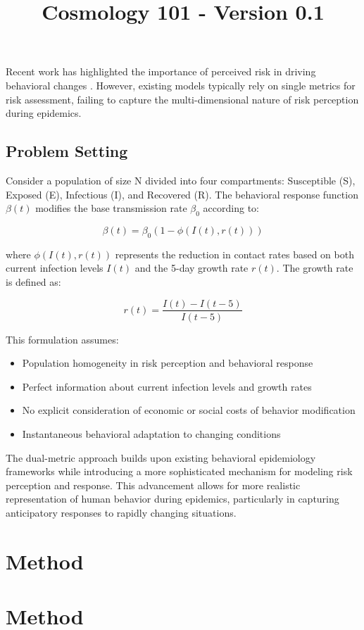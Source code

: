 \documentclass{article}\usepackage{graphicx} \usepackage{amsmath} \usepackage{colortbl}\title{Cosmology 101 - Version 0.1}
\begin{document}
Recent work has highlighted the importance of perceived risk in driving behavioral changes \cite{wang2020impact}. However, existing models typically rely on single metrics for risk assessment, failing to capture the multi-dimensional nature of risk perception during epidemics.

\subsection{Problem Setting}
Consider a population of size N divided into four compartments: Susceptible (S), Exposed (E), Infectious (I), and Recovered (R). The behavioral response function $\beta(t)$ modifies the base transmission rate $\beta_0$ according to:

\begin{equation}
\beta(t) = \beta_0(1 - \phi(I(t), r(t)))
\end{equation}

where $\phi(I(t), r(t))$ represents the reduction in contact rates based on both current infection levels $I(t)$ and the 5-day growth rate $r(t)$. The growth rate is defined as:

\begin{equation}
r(t) = \frac{I(t) - I(t-5)}{I(t-5)}
\end{equation}

This formulation assumes:
\begin{itemize}
\item Population homogeneity in risk perception and behavioral response
\item Perfect information about current infection levels and growth rates
\item No explicit consideration of economic or social costs of behavior modification
\item Instantaneous behavioral adaptation to changing conditions
\end{itemize}

The dual-metric approach builds upon existing behavioral epidemiology frameworks while introducing a more sophisticated mechanism for modeling risk perception and response. This advancement allows for more realistic representation of human behavior during epidemics, particularly in capturing anticipatory responses to rapidly changing situations.\section{Method}\section{Method}
\end{document}

